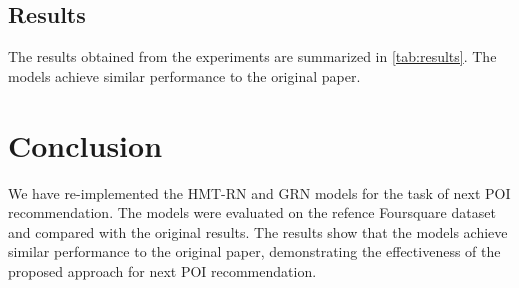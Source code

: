 \documentclass[twocolumn,twoside]{article}
\begin{document}
\subsection{Results}
The results obtained from the experiments are summarized in \cref{tab:results}.
The models achieve similar performance to the original paper.


\section{Conclusion}
We have re-implemented the HMT-RN and GRN models for the task of
next POI recommendation. The models were evaluated on the refence
Foursquare dataset and compared with the original results. The
results show that the models achieve similar performance to the
original paper, demonstrating the effectiveness of the proposed
approach for next POI recommendation.


\end{document}
